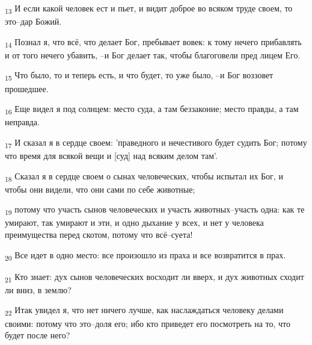 \begin{tcolorbox}
\textsubscript{13} И если какой человек ест и пьет, и видит доброе во всяком труде своем, то это--дар Божий.
\end{tcolorbox}
\begin{tcolorbox}
\textsubscript{14} Познал я, что всё, что делает Бог, пребывает вовек: к тому нечего прибавлять и от того нечего убавить, --и Бог делает так, чтобы благоговели пред лицем Его.
\end{tcolorbox}
\begin{tcolorbox}
\textsubscript{15} Что было, то и теперь есть, и что будет, то уже было, --и Бог воззовет прошедшее.
\end{tcolorbox}
\begin{tcolorbox}
\textsubscript{16} Еще видел я под солнцем: место суда, а там беззаконие; место правды, а там неправда.
\end{tcolorbox}
\begin{tcolorbox}
\textsubscript{17} И сказал я в сердце своем: 'праведного и нечестивого будет судить Бог; потому что время для всякой вещи и [суд] над всяким делом там'.
\end{tcolorbox}
\begin{tcolorbox}
\textsubscript{18} Сказал я в сердце своем о сынах человеческих, чтобы испытал их Бог, и чтобы они видели, что они сами по себе животные;
\end{tcolorbox}
\begin{tcolorbox}
\textsubscript{19} потому что участь сынов человеческих и участь животных--участь одна: как те умирают, так умирают и эти, и одно дыхание у всех, и нет у человека преимущества перед скотом, потому что всё--суета!
\end{tcolorbox}
\begin{tcolorbox}
\textsubscript{20} Все идет в одно место: все произошло из праха и все возвратится в прах.
\end{tcolorbox}
\begin{tcolorbox}
\textsubscript{21} Кто знает: дух сынов человеческих восходит ли вверх, и дух животных сходит ли вниз, в землю?
\end{tcolorbox}
\begin{tcolorbox}
\textsubscript{22} Итак увидел я, что нет ничего лучше, как наслаждаться человеку делами своими: потому что это--доля его; ибо кто приведет его посмотреть на то, что будет после него?
\end{tcolorbox}
